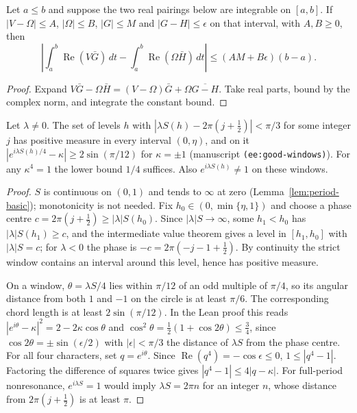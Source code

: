 \begin{lemma}
\label{lem:transport-pairing-error}
\leanok
Let $a\le b$ and suppose the two real pairings below are integrable on $[a,b]$.
If $|V-\Omega|\le A$, $|\Omega|\le B$, $|G|\le M$ and $|G-H|\le\epsilon$
on that interval, with $A,B\ge0$, then
\[
 \left|\int_a^b\operatorname{Re}(V\bar G)\,dt
       -\int_a^b\operatorname{Re}(\Omega\bar H)\,dt\right|
 \le (AM+B\epsilon)(b-a).
\]
\end{lemma}

\begin{proof}
\leanok
Expand $V\bar G-\Omega\bar H=(V-\Omega)\bar G+\Omega\overline{G-H}$.
Take real parts, bound by the complex norm, and integrate the constant bound.
\end{proof}

\begin{lemma}
\label{lem:good-windows}
\leanok
Let $\lambda\ne0$. The set of levels $h$ with $|\lambda S(h)-2\pi(j+\tfrac12)|<\pi/3$
for some integer $j$ has positive measure in every interval $(0,\eta)$, and on it
$|e^{i\lambda S(h)/4}-\kappa|\ge2\sin(\pi/12)$ for $\kappa=\pm1$
(manuscript \texttt{(ee:good-windows)}). For any $\kappa^4=1$ the lower
bound $1/4$ suffices. Also $e^{i\lambda S(h)}\ne1$ on these windows.
\end{lemma}

\begin{proof}
\leanok
$S$ is continuous on $(0,1)$ and tends to $\infty$ at zero (Lemma~\ref{lem:period-basic});
monotonicity is not needed. Fix $h_0\in(0,\min\{\eta,1\})$ and choose a phase centre
$c=2\pi(j+\tfrac12)\ge|\lambda|S(h_0)$. Since $|\lambda|S\to\infty$, some $h_1<h_0$ has
$|\lambda|S(h_1)\ge c$, and the intermediate value theorem gives a level in $[h_1,h_0]$
with $|\lambda|S=c$; for $\lambda<0$ the phase is $-c=2\pi(-j-1+\tfrac12)$. By continuity
the strict window contains an interval around this level, hence has positive measure.

On a window, $\theta=\lambda S/4$ lies within $\pi/12$ of an odd multiple of
$\pi/4$, so its angular distance from both $1$ and $-1$ on the circle
is at least $\pi/6$. The corresponding chord length is at least
$2\sin(\pi/12)$. In the Lean proof this reads
$|e^{i\theta}-\kappa|^2=2-2\kappa\cos\theta$ and
$\cos^2\theta=\tfrac12(1+\cos2\theta)\le\tfrac34$, since $\cos2\theta=\pm\sin(\epsilon/2)$
with $|\epsilon|<\pi/3$ the distance of $\lambda S$ from the phase centre.
For all four characters, set $q=e^{i\theta}$. Since $\operatorname{Re}(q^4)
=-\cos\epsilon\le0$, $1\le |q^4-1|$. Factoring the difference of squares
twice gives $|q^4-1|\le4|q-\kappa|$. For full-period nonresonance, $e^{i\lambda S}=1$ would imply
$\lambda S=2\pi n$ for an integer $n$, whose distance from
$2\pi(j+\tfrac12)$ is at least $\pi$.
\end{proof}

